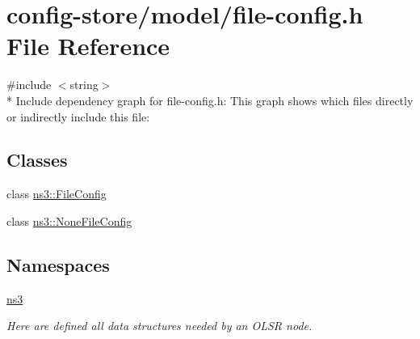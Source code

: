 \hypertarget{file-config_8h}{}\section{config-\/store/model/file-\/config.h File Reference}
\label{file-config_8h}
{\ttfamily \#include $<$string$>$}\\*
Include dependency graph for file-\/config.h\+:
This graph shows which files directly or indirectly include this file\+:
\subsection*{Classes}
\begin{DoxyCompactItemize}
\item 
class \hyperlink{classns3_1_1FileConfig}{ns3\+::\+File\+Config}
\item 
class \hyperlink{classns3_1_1NoneFileConfig}{ns3\+::\+None\+File\+Config}
\end{DoxyCompactItemize}
\subsection*{Namespaces}
\begin{DoxyCompactItemize}
\item 
 \hyperlink{namespacens3}{ns3}
\begin{DoxyCompactList}\small\item\em Here are defined all data structures needed by an O\+L\+SR node. \end{DoxyCompactList}\end{DoxyCompactItemize}
